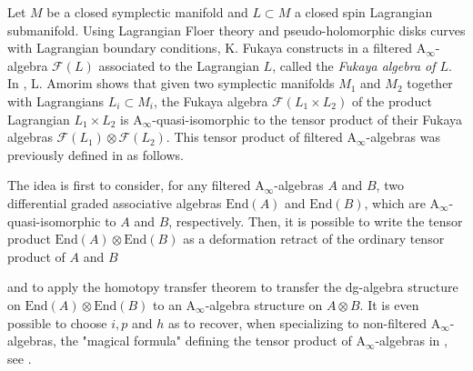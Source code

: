 \documentclass[twoside, 12pt]{amsart}
\theoremstyle{remark}
\newcommand{\Ainf}{\mathrm{A}_\infty} %
\begin{document}
Let $M$ be a closed symplectic manifold and $L \subset M$ a closed spin Lagrangian submanifold. 
Using Lagrangian Floer theory and pseudo-holomorphic disks curves with Lagrangian boundary conditions, K. Fukaya constructs in \cite{fukaya-cyclic-symmetry} a filtered $\Ainf$-algebra $\mathcal{F}(L)$ associated to the Lagrangian $L$, called the \textit{Fukaya algebra of $L$}. 
In \cite{amorim-lagrangian}, L. Amorim shows that given two symplectic manifolds $M_1$ and $M_2$ together with Lagrangians $L_i \subset M_i$, the Fukaya algebra $\mathcal{F}(L_1 \times L_2)$ of the product Lagrangian $L_1 \times L_2$ is $\Ainf$-quasi-isomorphic to the tensor product of their Fukaya algebras $\mathcal{F}(L_1) \otimes \mathcal{F}(L_2)$. 
This tensor product of filtered $\Ainf$-algebras was previously defined in \cite{amorim-tensor} as follows. 

The idea is first to consider, for any filtered $\Ainf$-algebras $A$ and $B$, two differential graded associative algebras $\mathrm{End}(A)$ and $\mathrm{End}(B)$, which are $\Ainf$-quasi-isomorphic to $A$ and $B$, respectively.
Then, it is possible to write the tensor product $\mathrm{End}(A) \otimes \mathrm{End}(B)$ as a deformation retract of the ordinary tensor product of $A$ and $B$
\begin{center} 
\end{center}
and to apply the homotopy transfer theorem to transfer the dg-algebra structure on $\mathrm{End}(A) \otimes \mathrm{End}(B)$ to an $\Ainf$-algebra structure on $A \otimes B$. 
It is even possible to choose $i,p$ and $h$ as to recover, when specializing to non-filtered $\Ainf$-algebras, the "magical formula" defining the tensor product of $\Ainf$-algebras in \cite{MarklShnider06,MTTV19}, see \cite[Corollary 4.2]{amorim-tensor}.
\end{document}
